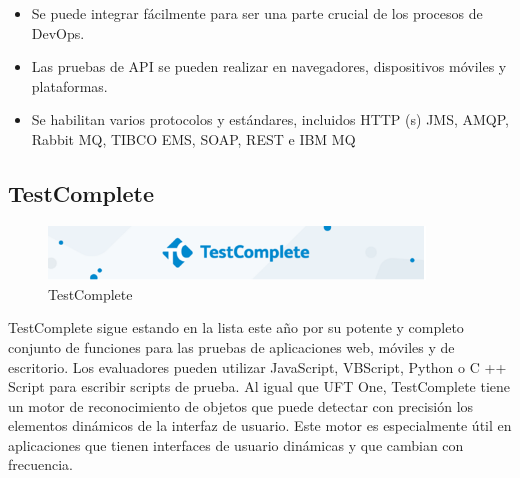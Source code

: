 \documentclass[12pt,letterpaper]{article}
\begin{document}
\begin{itemize}
    \item Se puede integrar fácilmente para ser una parte crucial de los procesos de DevOps.
    \item Las pruebas de API se pueden realizar en navegadores, dispositivos móviles y plataformas.
    \item Se habilitan varios protocolos y estándares, incluidos HTTP (s) JMS, AMQP, Rabbit MQ, TIBCO EMS, SOAP, REST e IBM MQ
\end{itemize}



\subsection{TestComplete}
\begin{figure}[h]
    \begin{center}
    \includegraphics[width=10cm]{./Imagenes/image5.png}
    \caption{TestComplete}
    \label{rg5}
    \end{center}
    \end{figure}
TestComplete sigue estando en la lista este año por su potente y completo conjunto de funciones para las pruebas de aplicaciones web, móviles y de escritorio. Los evaluadores pueden utilizar JavaScript, VBScript, Python o C ++ Script para escribir scripts de prueba.
Al igual que UFT One, TestComplete tiene un motor de reconocimiento de objetos que puede detectar con precisión los elementos dinámicos de la interfaz de usuario. Este motor es especialmente útil en aplicaciones que tienen interfaces de usuario dinámicas y que cambian con frecuencia.
\end{document}
